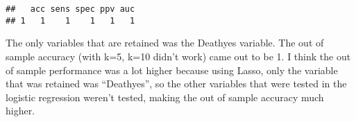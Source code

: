 \documentclass[]{article}
\begin{document}
\begin{verbatim}
##   acc sens spec ppv auc
## 1   1    1    1   1   1
\end{verbatim}

The only variables that are retained was the Deathyes variable. The out
of sample accuracy (with k=5, k=10 didn't work) came out to be 1. I
think the out of sample performance was a lot higher because using
Lasso, only the variable that was retained was ``Deathyes'', so the
other variables that were tested in the logistic regression weren't
tested, making the out of sample accuracy much higher.
\end{document}
